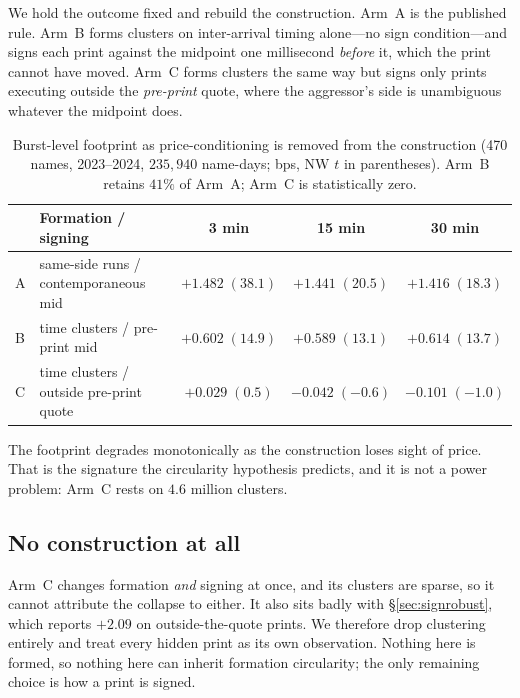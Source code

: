 \documentclass[11pt]{article}
\begin{document}
We hold the outcome fixed and rebuild the construction. Arm~A is the published rule. Arm~B
forms clusters on inter-arrival timing alone---no sign condition---and signs each print
against the midpoint one millisecond \emph{before} it, which the print cannot have moved.
Arm~C forms clusters the same way but signs only prints executing outside the \emph{pre-print}
quote, where the aggressor's side is unambiguous whatever the midpoint does.

\begin{table}[htbp]
\centering
\begin{tabular}{llccc}
\toprule
& \textbf{Formation / signing} & \textbf{3 min} & \textbf{15 min} & \textbf{30 min} \\
\midrule
A & same-side runs / contemporaneous mid & $+1.482\;(38.1)$ & $+1.441\;(20.5)$ & $+1.416\;(18.3)$ \\
B & time clusters / pre-print mid & $+0.602\;(14.9)$ & $+0.589\;(13.1)$ & $+0.614\;(13.7)$ \\
C & time clusters / outside pre-print quote & $+0.029\;(0.5)$ & $-0.042\;(-0.6)$ & $-0.101\;(-1.0)$ \\
\bottomrule
\end{tabular}
\caption{Burst-level footprint as price-conditioning is removed from the construction (470
names, 2023--2024, $235{,}940$ name-days; bps, NW $t$ in parentheses). Arm~B retains $41\%$ of
Arm~A; Arm~C is statistically zero.}
\label{tab:freeform}
\end{table}

The footprint degrades monotonically as the construction loses sight of price. That is the
signature the circularity hypothesis predicts, and it is not a power problem: Arm~C rests on
$4.6$ million clusters.

\subsection{No construction at all}

Arm~C changes formation \emph{and} signing at once, and its clusters are sparse, so it cannot
attribute the collapse to either. It also sits badly with \S\ref{sec:signrobust}, which reports
$+2.09$ on outside-the-quote prints. We therefore drop clustering entirely and treat every
hidden print as its own observation. Nothing here is formed, so nothing here can inherit
formation circularity; the only remaining choice is how a print is signed.
\end{document}
